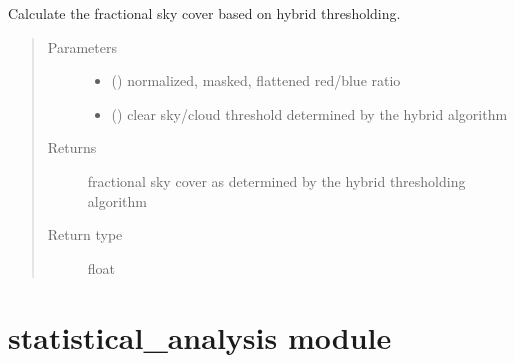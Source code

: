 \documentclass[letterpaper,10pt,english]{sphinxmanual}
\begin{document}
\begin{fulllineitems}
\label{\detokenize{skycover:skycover.hybrid}}
Calculate the fractional sky cover based on hybrid thresholding.
\begin{quote}\begin{description}
\item[{Parameters}] \leavevmode\begin{itemize}
\item {} 
 () \textendash{} normalized, masked, flattened red/blue ratio

\item {} 
 () \textendash{} clear sky/cloud threshold determined by the hybrid algorithm

\end{itemize}

\item[{Returns}] \leavevmode
fractional sky cover as determined by the hybrid thresholding algorithm

\item[{Return type}] \leavevmode
float

\end{description}\end{quote}

\end{fulllineitems}



\section{statistical\_analysis module}
\label{\detokenize{statistical_analysis:statistical-analysis-module}}\label{\detokenize{statistical_analysis::doc}}\label{\detokenize{statistical_analysis:module-statistical_analysis}}
\end{document}
